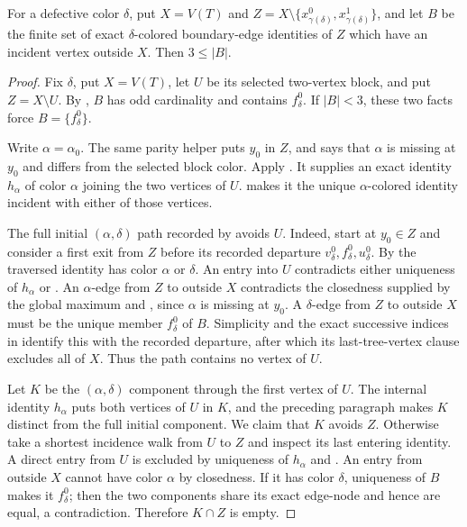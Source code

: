 \begin{helper}
For a defective color $\delta$, put
$X=V(T)$ and
$Z=X\setminus\{x^0_{\gamma(\delta)},x^1_{\gamma(\delta)}\}$, and let
$B$ be the finite set of exact $\delta$-colored boundary-edge identities
of $Z$ which have an incident vertex outside $X$.  Then $3\le |B|$.
\end{helper}
\begin{proof}
Fix $\delta$, put $X=V(T)$, let $U$ be its selected two-vertex block, and
put $Z=X\setminus U$.  By ,
$B$ has odd cardinality and contains $f^0_\delta$.  If $|B|<3$, these two
facts force $B=\{f^0_\delta\}$.

Write $\alpha=\alpha_0$.  The same parity helper puts $y_0$ in $Z$, and
 says that $\alpha$ is missing at $y_0$
and differs from the selected block color.  Apply
.  It supplies an exact identity
$h_\alpha$ of color $\alpha$ joining the two vertices of $U$.
 makes it the unique $\alpha$-colored
identity incident with either of those vertices.

The full initial $(\alpha,\delta)$ path recorded by
 avoids $U$.  Indeed, start at $y_0\in Z$
and consider a first exit from $Z$ before its recorded departure
$v^0_\delta,f^0_\delta,u^0_\delta$.  By
 the traversed identity has color
$\alpha$ or $\delta$.  An entry into $U$ contradicts either uniqueness of
$h_\alpha$ or .  An $\alpha$-edge from
$Z$ to outside $X$ contradicts the closedness supplied by the global
maximum and , since $\alpha$ is missing
at $y_0$.  A $\delta$-edge from $Z$ to outside $X$ must be the unique
member $f^0_\delta$ of $B$.  Simplicity and the exact successive indices
in  identify this with the recorded
departure, after which its last-tree-vertex clause excludes all of $X$.
Thus the path contains no vertex of $U$.

Let $K$ be the $(\alpha,\delta)$ component through the first vertex of
$U$.  The internal identity $h_\alpha$ puts both vertices of $U$ in $K$,
and the preceding paragraph makes $K$ distinct from the full initial
component.  We claim that $K$ avoids $Z$.  Otherwise take a shortest
incidence walk from $U$ to $Z$ and inspect its last entering identity.
A direct entry from $U$ is excluded by uniqueness of $h_\alpha$ and
.  An entry from outside $X$ cannot have
color $\alpha$ by closedness.  If it has color $\delta$, uniqueness of
$B$ makes it $f^0_\delta$; then the two components share its exact
edge-node and hence are equal, a contradiction.  Therefore $K\cap Z$ is
empty.


\end{proof}

